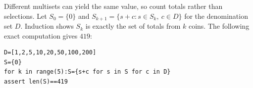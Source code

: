 Different multisets can yield the same value, so count totals rather than selections. Let $ S_0=\{0\}$ and $ S_{k+1}=\{s+c:s\in S_k,\ c\in D\}$ for the denomination set $ D $. Induction shows $ S_k $ is exactly the set of totals from $ k $ coins. The following exact computation gives $\boxed{419}$:
\begin{verbatim}
D=[1,2,5,10,20,50,100,200]
S={0}
for k in range(5):S={s+c for s in S for c in D}
assert len(S)==419
\end{verbatim}
